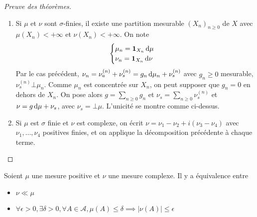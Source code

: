 \begin{proof}[Preuve des théorèmes]
\begin{enumerate}
Cela donne le théorème de Radon-Nikodyn dans le cas $\mu,\nu$ positives fines. Montrons l'unicité. Supposons que $\nu= \nu_a+\nu_s = \nu_a' + \nu_s'$
Alors $\nu_a- \nu_a'= \nu_s'-\nu_s$, et il existe $N,N'\in \mathcal{A}$, avec $\mu(N)=\mu(N')=0$ et $\nu_s'((N')^c)=\nu_s (N^c)=0$.
Alors si $A\in \mathcal{A}$,
\begin{align*}
(\nu_s' -\nu_{s})(A) &= (\nu_s' -\nu_s)(A\cap (N\cup N' ))\\
&= (\nu_a- \nu_a' )(A\cap (N\cup N' ))\\
&=0 
\end{align*}
car $\mu(A\cap (N\cup N' ))\leq \mu(N\cup N' )=0$, donc $\nu_s=\nu_s'$ et $\nu_a=\nu_a'$.
De même, si $h\diff\mu=h'\diff\mu=\nu$ avec $h,h'\geq 0$, alors
\[ \int_{h' >h}h' \diff\mu = \nu(\{h' >h\})= \int_{h' >h}h\diff\mu\]
donc \[ \int_{h'>h}(h'-h)\diff\mu =0,\] d'où $\mu(\{h'>h\})=0$
et $h'\leq h$ $\mu$-presque partout, donc par symétrie des rôles $h=h'$
\item 
    Si $\mu$ et $\nu$ sont $\sigma$-finies,
il existe une partition mesurable $(X_n)_{n\geq 0}$ de $X$ avec $\mu(X_n)<+\infty$ et $\nu(X_n)<+\infty$.
On note \[
    \begin{cases}
    \mu_n=\bm{1}_{X_n}\mathop{}\!\mathrm d\mu\\ \nu_n=\bm{1}_{X_n}\mathop{}\!\mathrm d\nu
    \end{cases}\]
Par le cas précédent, $\nu_n = \nu_a^{(n)}+\nu_s^{(n)}=g_n \mathop{}\!\mathrm d\mu_n +\nu_s^{(n)}$ avec $g_n\geq 0$ mesurable, $\nu_s^{(n)}\bot \mu_n$.
Comme $\mu_n$ est concentrée sur $X_n$, on peut supposer que $g_n=0$ en dehors de $X_n$.
On pose alors $g= \sum_{n\geq0} g_n$ et $\nu_s =\sum_{n\geq 0}\nu_s^{(n)}$
et $\nu=g\mathop{}\!\mathrm d\mu+\nu_s$, avec $\nu_s=\bot \mu$. L'unicité se montre comme ci-dessus.
\item 
    Si $\mu$ est $\sigma$ finie et $\nu$ est complexe,
on écrit $\nu=\nu_1-\nu_2 +i(\nu_3-\nu_4)$ avec $\nu_1,\dots,\nu_4$ positives finies, et on applique la décomposition précédente à chaque terme.
    \end{enumerate}
\end{proof}

\begin{prop}
Soient $\mu$ une mesure positive et $\nu$ une mesure complexe. Il y a équivalence entre  \begin{itemize}
    \item $\nu\ll\mu$
    \item  $\forall  \epsilon>0, \exists  \delta>0, \forall  A \in  \mathcal  A, \mu(A)\leq \delta \implies |\nu(A)|\leq \epsilon$
\end{itemize}
\end{prop}

